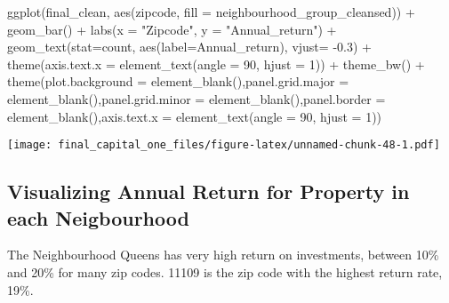 \documentclass[
]{article}
\newenvironment{Shaded}{\begin{snugshade}}{\end{snugshade}}
\newcommand{\AttributeTok}[1]{\textcolor[rgb]{0.77,0.63,0.00}{#1}}
\newcommand{\DecValTok}[1]{\textcolor[rgb]{0.00,0.00,0.81}{#1}}
\newcommand{\FloatTok}[1]{\textcolor[rgb]{0.00,0.00,0.81}{#1}}
\newcommand{\FunctionTok}[1]{\textcolor[rgb]{0.00,0.00,0.00}{#1}}
\newcommand{\NormalTok}[1]{#1}
\newcommand{\SpecialCharTok}[1]{\textcolor[rgb]{0.00,0.00,0.00}{#1}}
\newcommand{\StringTok}[1]{\textcolor[rgb]{0.31,0.60,0.02}{#1}}
\begin{document}
\begin{Shaded}
\begin{Highlighting}[]
\FunctionTok{ggplot}\NormalTok{(final\_clean, }\FunctionTok{aes}\NormalTok{(zipcode, }\AttributeTok{fill =}\NormalTok{ neighbourhood\_group\_cleansed)) }\SpecialCharTok{+} \FunctionTok{geom\_bar}\NormalTok{() }\SpecialCharTok{+} \FunctionTok{labs}\NormalTok{(}\AttributeTok{x =} \StringTok{"Zipcode"}\NormalTok{, }\AttributeTok{y =} \StringTok{"Annual\_return"}\NormalTok{) }\SpecialCharTok{+} \FunctionTok{geom\_text}\NormalTok{(}\AttributeTok{stat=}\StringTok{\textquotesingle{}count\textquotesingle{}}\NormalTok{, }\FunctionTok{aes}\NormalTok{(}\AttributeTok{label=}\NormalTok{Annual\_return), }\AttributeTok{vjust=} \SpecialCharTok{{-}}\FloatTok{0.3}\NormalTok{) }\SpecialCharTok{+} \FunctionTok{theme}\NormalTok{(}\AttributeTok{axis.text.x =} \FunctionTok{element\_text}\NormalTok{(}\AttributeTok{angle =} \DecValTok{90}\NormalTok{, }\AttributeTok{hjust =} \DecValTok{1}\NormalTok{))  }\SpecialCharTok{+} \FunctionTok{theme\_bw}\NormalTok{() }\SpecialCharTok{+} \FunctionTok{theme}\NormalTok{(}\AttributeTok{plot.background =} \FunctionTok{element\_blank}\NormalTok{(),}\AttributeTok{panel.grid.major =} \FunctionTok{element\_blank}\NormalTok{(),}\AttributeTok{panel.grid.minor =} \FunctionTok{element\_blank}\NormalTok{(),}\AttributeTok{panel.border =} \FunctionTok{element\_blank}\NormalTok{(),}\AttributeTok{axis.text.x =} \FunctionTok{element\_text}\NormalTok{(}\AttributeTok{angle =} \DecValTok{90}\NormalTok{, }\AttributeTok{hjust =} \DecValTok{1}\NormalTok{))}
\end{Highlighting}
\end{Shaded}

\texttt{[image: final\_capital\_one\_files/figure-latex/unnamed-chunk-48-1.pdf]}

\hypertarget{visualizing-annual-return-for-property-in-each-neigbourhood}{%
\subsection{Visualizing Annual Return for Property in each
Neigbourhood}\label{visualizing-annual-return-for-property-in-each-neigbourhood}}

The Neighbourhood Queens has very high return on investments, between
10\% and 20\% for many zip codes. 11109 is the zip code with the highest
return rate, 19\%.
\end{document}
